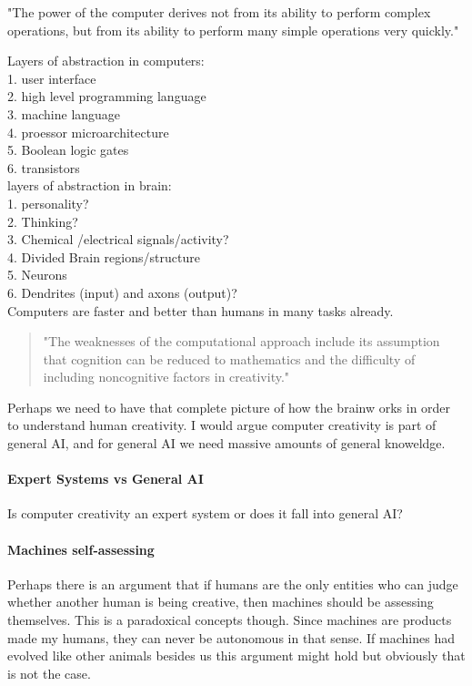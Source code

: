 "The power of the computer derives not from its ability to perform complex operations, but from its ability to perform many simple operations very quickly."

Layers of abstraction in computers:\\
1.	user interface\\
2.	high level programming language\\
3.	machine language\\
4.	proessor microarchitecture\\
5.	Boolean logic gates\\
6.	transistors\\

layers of abstraction in brain:\\
1.	personality?\\
2.	Thinking?\\
3.	Chemical /electrical signals/activity?\\
4.	Divided Brain regions/structure\\
5.	Neurons\\
6.	Dendrites (input) and axons (output)?\\


Computers are faster and better than humans in many tasks already.

\begin{quote}
"The weaknesses of the computational approach include its assumption that cognition can be reduced to mathematics and the difficulty of including noncognitive factors in creativity." \autocite[p.457]{Mayer1999}
\end{quote}


Perhaps we need to have that complete picture of how the brainw orks in order to understand human creativity. I would argue computer creativity is part of general \ac{AI}, and for general \ac{AI} we need massive amounts of general knoweldge.
\paragraph{Expert Systems vs General AI}
Is computer creativity an expert system or does it fall into general \ac{AI}? 

\paragraph{Machines self-assessing}
Perhaps there is an argument that if humans are the only entities who can judge whether another human is being creative, then machines should be assessing themselves. This is a paradoxical concepts though. Since machines are products made my humans, they can never be autonomous in that sense. If machines had evolved like other animals besides us this argument might hold but obviously that is not the case.


